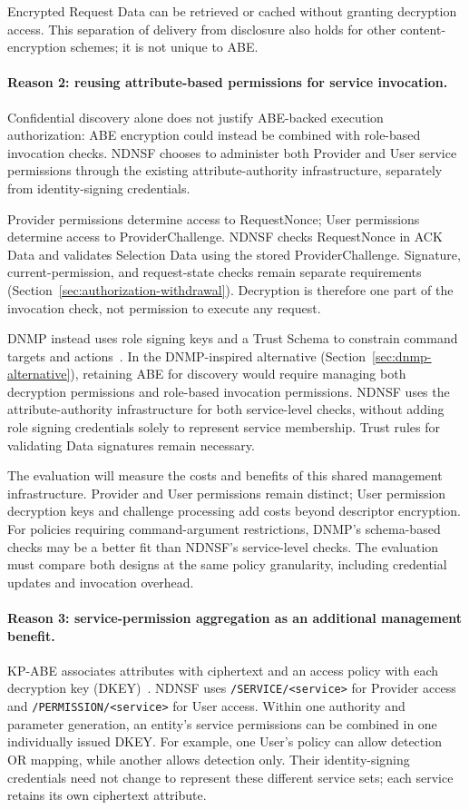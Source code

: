 Encrypted Request Data can be retrieved or cached without granting decryption
access. This separation of delivery from disclosure also holds for other
content-encryption schemes; it is not unique to ABE.

\paragraph{Reason 2: reusing attribute-based permissions for service invocation.}
Confidential discovery alone does not justify ABE-backed execution authorization:
ABE encryption could instead be combined with role-based invocation checks.
NDNSF chooses to administer both Provider and User service permissions through
the existing attribute-authority infrastructure, separately from identity-signing
credentials.

Provider permissions determine access to RequestNonce; User permissions
determine access to ProviderChallenge. NDNSF checks RequestNonce in ACK Data
and validates Selection Data using the stored ProviderChallenge. Signature,
current-permission, and request-state checks remain separate requirements
(Section~\ref{sec:authorization-withdrawal}). Decryption is therefore one part of
the invocation check, not permission to execute any request.

DNMP instead uses role signing keys and a Trust Schema to constrain command
targets and actions~\cite{dnmp}. In the DNMP-inspired alternative
(Section~\ref{sec:dnmp-alternative}), retaining ABE for discovery would require
managing both decryption permissions and role-based invocation permissions.
NDNSF uses the attribute-authority infrastructure for both service-level checks,
without adding role signing credentials solely to represent service membership.
Trust rules for validating Data signatures remain necessary.

The evaluation will measure the costs and benefits of this shared management
infrastructure. Provider and User permissions remain distinct; User permission
decryption keys and challenge processing add costs beyond descriptor encryption.
For policies requiring command-argument restrictions, DNMP's schema-based checks may be a better fit than
NDNSF's service-level checks. The evaluation must compare both designs at the
same policy granularity, including credential updates and invocation overhead.

\paragraph{Reason 3: service-permission aggregation as an additional management benefit.}
KP-ABE associates attributes with ciphertext and an access policy with each
decryption key (DKEY)~\cite{goyal2006abe,dulal2023nacabe}. NDNSF uses
\texttt{/SERVICE/<service>} for Provider access and
\texttt{/PERMISSION/<service>} for User access. Within one authority and parameter
generation, an entity's service permissions can be combined in one individually
issued DKEY. For example, one User's policy can allow detection OR mapping,
while another allows detection only. Their identity-signing credentials need
not change to represent these different service sets; each service retains its
own ciphertext attribute.

